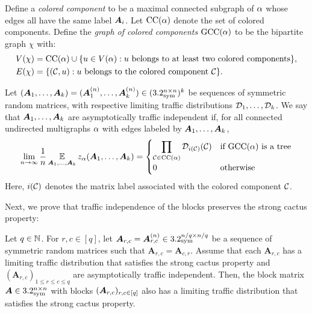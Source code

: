 Define a \emph{colored component} to be a maximal connected subgraph of $\alpha$ whose edges all have the same label ${\bm A}_i$.
Let $\operatorname{CC}(\alpha)$ denote the set of colored components.
Define the \emph{graph of colored components} $\operatorname{GCC}(\alpha)$ to be the bipartite graph $\chi$ with:
\begin{align*}
    V(\chi) &= \operatorname{CC}(\alpha) \cup \{u \in V(\alpha): u \text{ belongs to at least two colored components}\}, \\
    E(\chi) &= \{({\cal C}, u): u \text{ belongs to the colored component }{\cal C}\}.
\end{align*}

\begin{definition}
    \label{def:traffic independence}
    Let $({\bm A}_1, \dots, {\bm A}_k) = ({\bm A}_1^{(n)},\dots, {\bm A}_k^{(n)}) \in (3.2^{n \times n}_{\mathrm{sym}})^k$ be sequences of symmetric random matrices, with respective limiting traffic distributions
    ${\cal D}_1, \ldots, {\cal D}_k$.
    We say that ${\bm A}_1,\dots, {\bm A}_k$ are {asymptotically traffic independent} if,
    for all connected undirected multigraphs $\alpha$ with edges labeled by ${\bm A}_1, \dots, {\bm A}_k$,
    \[
        \lim_{n \to \infty} \frac 1n \operatorname*{\mathbb{E}}_{{\bm A}_1, \dots, {\bm A}_k}z_\alpha({\bm A}_1, \dots, {\bm A}_k) = \begin{cases}
            \displaystyle\prod_{{\cal C} \in \operatorname{CC}(\alpha)} {\cal D}_{i({\cal C})}({\cal C}) & \textnormal{if GCC($\alpha$) is a tree}\\
            0 & \textnormal{otherwise}
        \end{cases}
    \]
    Here, $i({\cal C})$ denotes the matrix label associated with the colored component ${\cal C}$.
\end{definition}

Next, we prove that traffic independence of the blocks preserves the strong cactus property:

\begin{proposition}
    \label{prop:block-matrix-strong-cactus}
    Let $q \in \mathbb{N}$. For $r,c\in [q]$, let ${\bm A}_{r,c} = {\bm A}_{r,c}^{(n)} \in 3.2^{n/q \times n/q}_{\mathrm{sym}}$ be a sequence of symmetric random matrices such that $\bm A_{r,c} = \bm A_{c,r}$.
    Assume that each $\bm A_{r,c}$ has a limiting traffic distribution that satisfies the strong cactus property and $(\bm A_{r,c})_{1 \leq r\leq c \leq q}$
    are asymptotically traffic independent. Then, the block matrix ${\bm A}\in 3.2^{n\times n}_{\mathrm{sym}}$ with blocks $({\bm A}_{r,c})_{r,c\in [q]}$ also has a limiting traffic distribution that satisfies the strong cactus property.
\end{proposition}


